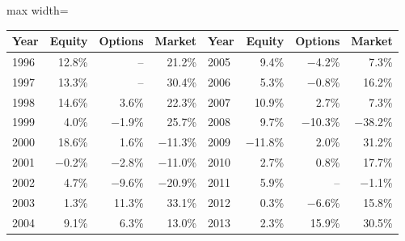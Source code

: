 {\small
\begin{adjustbox}{max width=\linewidth}
\begin{tabular}{lrrr@{\hspace{2em}}lrrr}
\toprule
Year & Equity & Options & Market & Year & Equity & Options & Market \\
\midrule
1996 & 12.8\% & -- & 21.2\% & 2005 & 9.4\% & $-$4.2\% & 7.3\% \\
1997 & 13.3\% & -- & 30.4\% & 2006 & 5.3\% & $-$0.8\% & 16.2\% \\
1998 & 14.6\% & 3.6\% & 22.3\% & 2007 & 10.9\% & 2.7\% & 7.3\% \\
1999 & 4.0\% & $-$1.9\% & 25.7\% & 2008 & 9.7\% & $-$10.3\% & $-$38.2\% \\
2000 & 18.6\% & 1.6\% & $-$11.3\% & 2009 & $-$11.8\% & 2.0\% & 31.2\% \\
2001 & $-$0.2\% & $-$2.8\% & $-$11.0\% & 2010 & 2.7\% & 0.8\% & 17.7\% \\
2002 & 4.7\% & $-$9.6\% & $-$20.9\% & 2011 & 5.9\% & -- & $-$1.1\% \\
2003 & 1.3\% & 11.3\% & 33.1\% & 2012 & 0.3\% & $-$6.6\% & 15.8\% \\
2004 & 9.1\% & 6.3\% & 13.0\% & 2013 & 2.3\% & 15.9\% & 30.5\% \\
\bottomrule
\end{tabular}
\end{adjustbox}
}
